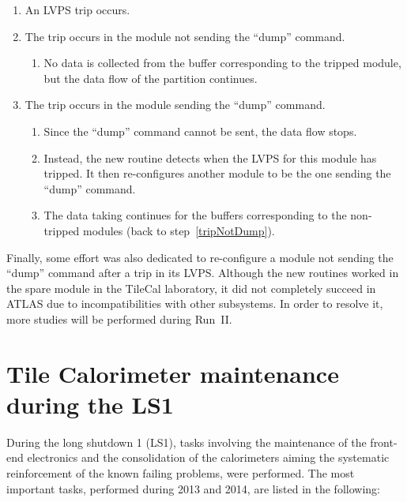 \begin{enumerate}
\item An LVPS trip occurs.
\item\label{tripNotDump} The trip occurs in the module not sending the ``dump'' command.
\begin{enumerate}
\item No data is collected from the buffer corresponding to the tripped module, but the data flow of the partition continues.
\end{enumerate}

\item The trip occurs in the module sending the ``dump'' command.
\begin{enumerate}
\item Since the ``dump'' command cannot be sent, the data flow stops.
\item Instead, the new routine detects when the LVPS for this module has tripped. It then re-configures another module to be the one sending the ``dump'' command.
\item The data taking continues for the buffers corresponding to the non-tripped modules (back to step~\ref{tripNotDump}).
\end{enumerate}
\end{enumerate}

Finally, some effort was also dedicated to re-configure a module not sending the ``dump'' command after a trip in its LVPS.
Although the new routines worked in the spare module in the TileCal laboratory, it did not completely succeed in ATLAS due to incompatibilities with other subsystems.
In order to resolve it, more studies will be performed during Run~II.


\section{Tile Calorimeter maintenance during the LS1}

During the long shutdown 1 (LS1), tasks involving the maintenance of the front-end electronics and the consolidation of the calorimeters aiming the systematic reinforcement of the known failing problems, were performed.
The most important tasks, performed during 2013 and 2014, are listed in the following:

